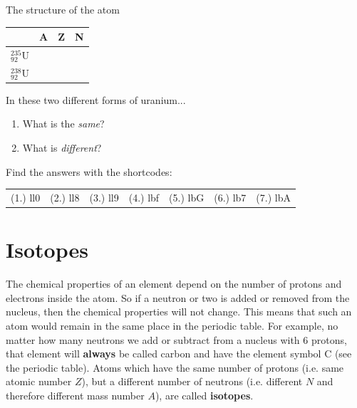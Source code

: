 \begin{exercises}{The structure of the atom}
\begin{enumerate}[noitemsep, label=\textbf{\arabic*}. ]
\begin{table}[H]
\begin{center}
\begin{tabular}{|l|l|l|l|}
         &
        \textbf{A} &
        \textbf{Z} &
        \textbf{N} \\ \hline
        $_{92}^{235}\text{U}$ &
         &
         &
        \\ \hline
        $_{92}^{238}\text{U}$ &
         &
         &
     \\ \hline
    \end{tabular}
      \end{center}
\end{table}
    \par
In these two different forms of uranium...
\label{m38745*id257277}\begin{enumerate}[noitemsep, label=\textbf{\alph*}. ] 
            \label{m38745*uid38}\item What is the \textsl{same}?
\label{m38745*uid39}\item What is \textsl{different}?
\end{enumerate}
\end{enumerate}
  \label{m38745**end}
\practiceinfo
\par {} Find the answers with the shortcodes:
 \par \begin{tabular}[h]{ccccccc}
 (1.) ll0  &  (2.) ll8  &  (3.) ll9  &  (4.) lbf  &  (5.) lbG  &  (6.) lb7  &  (7.) lbA  & \end{tabular}
\end{exercises}
         \section{Isotopes}
    \nopagebreak
The chemical properties of an element depend on the number of protons and electrons inside the atom. So if a neutron or two is added or removed from the nucleus, then the chemical properties will not change. This means that such an atom would remain in the same place in the periodic table. For example, no matter how many neutrons we add or subtract from a nucleus with 6 protons, that element will \textbf{always} be called carbon and have the element symbol $\text{C}$ (see the periodic table). Atoms which have the same number of protons (i.e. same atomic number $Z$), but a different number of neutrons (i.e. different $N$ and therefore different mass number $A$), are called \textbf{isotopes}. 

